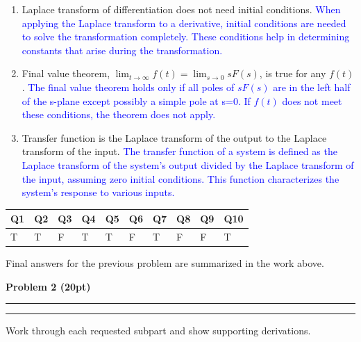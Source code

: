 \documentclass[12pt]{article}
\newcommand{\question}[1]{%
  \clearpage
  \vspace{0.5cm}
  {\noindent\normalsize \textbf{#1}}
  \vspace{0.2cm}
  \hrule
  \vspace{0.1cm}
  \hrule
  \vspace{0.3cm}
}
\begin{document}
\begin{enumerate}
	      \textcolor{blue}{The Laplace transform of the unit step function \( u(t) \) is \( \frac{1}{s} \) due to the theory of Laplace transforms used in solving differential equations and analyzing systems.}
	\item Laplace transform of differentiation does not need initial conditions.\newline
	      \textcolor{blue}{When applying the Laplace transform to a derivative, initial conditions are needed to solve the transformation completely. These conditions help in determining constants that arise during the transformation.}
	\item Final value theorem, $\lim_{t \to \infty} f(t) = \lim_{s \to 0} sF(s)$, is true for any $f(t)$.\newline
	      \textcolor{blue}{The final value theorem holds only if all poles of \( sF(s) \) are in the left half of the s-plane except possibly a simple pole at s=0. If \( f(t) \) does not meet these conditions, the theorem does not apply.}
	\item Transfer function is the Laplace transform of the output to the Laplace transform of the input.\newline
	      \textcolor{blue}{The transfer function of a system is defined as the Laplace transform of the system's output divided by the Laplace transform of the input, assuming zero initial conditions. This function characterizes the system's response to various inputs.}
	      	      
\end{enumerate}
\begin{center}
	\noindent %
	\begin{tabularx}{\textwidth}{|*{10}{X|}} %
		\hline
		Q1 & Q2 & Q3 & Q4 & Q5 & Q6 & Q7 & Q8 & Q9 & Q10 \\ \hline
		T  & T  & F  & T  & T  & F  & T  & F  & F  & T   \\ 
		\hline
	\end{tabularx}
\end{center}


\newpage
\begin{resultsbox}
Final answers for the previous problem are summarized in the work above.
\end{resultsbox}

\question{Problem 2 (20pt)}\label{quest:2}
\begin{stepbox}
Work through each requested subpart and show supporting derivations.
\end{stepbox}
\end{document}
